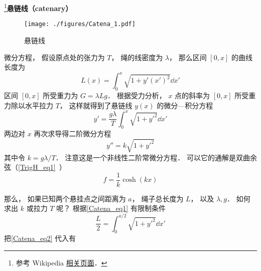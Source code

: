 
\footnote{参考 Wikipedia \href{https://en.wikipedia.org/wiki/Catenary}{相关页面}．}\textbf{悬链线（catenary）}

\begin{figure}[ht]
\centering
\texttt{[image: ./figures/Catena\_1.pdf]}
\caption{悬链线} \label{Catena_fig1}
\end{figure}

微分方程， 假设原点处的张力为 $T$， 绳的线密度为 $\lambda$， 那么区间 $[0, x]$ 的曲线长度为
\begin{equation}\label{Catena_eq1}
L(x) = \int_0^x \sqrt{1 + y'(x')^2} \dd{x'}
\end{equation}
区间 $[0, x]$ 所受重力为 $G = \lambda L g$． 根据受力分析， $x$ 点的斜率为 $[0, x]$ 所受重力除以水平拉力 $T$， 这样就得到了悬链线 $y(x)$ 的微分—积分方程
\begin{equation}
y' = \frac{g\lambda}{T} \int_0^x \sqrt{1 + y'^2} \dd{x'}
\end{equation}
两边对 $x$ 再次求导得二阶微分方程
\begin{equation}
y'' = k \sqrt{1 + y'^2}
\end{equation}
其中令 $k = g\lambda/T$． 注意这是一个非线性二阶常微分方程． 可以它的通解是双曲余弦（\autoref{TrigH_eq1}~）
\begin{equation}\label{Catena_eq2}
f = \frac{1}{k}\cosh(kx)
\end{equation}

那么， 如果已知两个悬挂点之间距离为 $a$， 绳子总长度为 $L$， 以及 $\lambda, g$． 如何求出 $k$ 或拉力 $T$ 呢？ 根据\autoref{Catena_eq1} 有限制条件
\begin{equation}
\frac{L}{2} = \int_0^{a/2} \sqrt{1 + y'^2} \dd{x'}
\end{equation}
把\autoref{Catena_eq2} 代入有
\begin{equation}

\end{equation}

